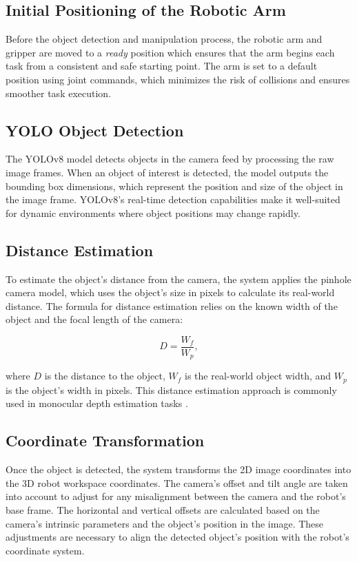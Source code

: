 \subsection{Initial Positioning of the Robotic Arm}
Before the object detection and manipulation process, the robotic arm and gripper are moved to a \textit{ready} position which ensures that the arm begins each task from a consistent and safe starting point. The arm is set to a default position using joint commands, which minimizes the risk of collisions and ensures smoother task execution.

\subsection{YOLO Object Detection}
The YOLOv8 model detects objects in the camera feed by processing the raw image frames. When an object of interest is detected, the model outputs the bounding box dimensions, which represent the position and size of the object in the image frame. YOLOv8’s real-time detection capabilities make it well-suited for dynamic environments where object positions may change rapidly.

\subsection{Distance Estimation}
To estimate the object’s distance from the camera, the system applies the pinhole camera model, which uses the object’s size in pixels to calculate its real-world distance. The formula for distance estimation relies on the known width of the object and the focal length of the camera:

\begin{equation}
D = \frac{W_f}{W_p},
\end{equation}

where $D$ is the distance to the object, $W_f$ is the real-world object width, and $W_p$ is the object’s width in pixels. This distance estimation approach is commonly used in monocular depth estimation tasks \cite{godard2017unsupervised}.

\subsection{Coordinate Transformation}
Once the object is detected, the system transforms the 2D image coordinates into the 3D robot workspace coordinates. The camera's offset and tilt angle are taken into account to adjust for any misalignment between the camera and the robot’s base frame. The horizontal and vertical offsets are calculated based on the camera's intrinsic parameters and the object’s position in the image. These adjustments are necessary to align the detected object’s position with the robot's coordinate system.

